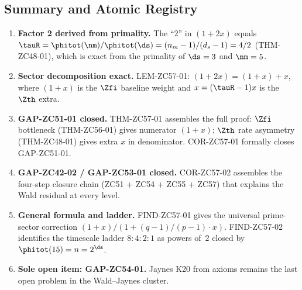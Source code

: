\documentclass[12pt, a4paper]{article}
\begin{document}
\subsection{Summary and Atomic Registry}

\begin{enumerate}[leftmargin=2em]

\item \textbf{Factor 2 derived from primality.}
  The ``$2$'' in $(1+2x)$ equals $\tauR=\phitot(\nm)/\phitot(\ds)
  =(n_m-1)/(d_s-1)=4/2$ (THM-ZC48-01), which is exact from the
  primality of $\ds=3$ and $\nm=5$.

\item \textbf{Sector decomposition exact.}
  LEM-ZC57-01: $(1+2x)=(1+x)+x$, where $(1+x)$ is the $\Zfi$
  baseline weight and $x=(\tauR-1)x$ is the $\Zth$ extra.

\item \textbf{GAP-ZC51-01 closed.}
  THM-ZC57-01 assembles the full proof: $\Zfi$ bottleneck
  (THM-ZC56-01) gives numerator $(1+x)$; $\Zth$ rate asymmetry
  (THM-ZC48-01) gives extra $x$ in denominator.  COR-ZC57-01
  formally closes GAP-ZC51-01.

\item \textbf{GAP-ZC42-02 / GAP-ZC53-01 closed.}
  COR-ZC57-02 assembles the four-step closure chain
  (ZC51 + ZC54 + ZC55 + ZC57) that explains the Wald residual
  at every level.

\item \textbf{General formula and ladder.}
  FIND-ZC57-01 gives the universal prime-sector correction
  $(1+x)/(1+(q-1)/(p-1)\cdot x)$.
  FIND-ZC57-02 identifies the timescale ladder $8:4:2:1$
  as powers of~$2$ closed by $\phitot(15)=n=2^{\ds}$.

\item \textbf{Sole open item: GAP-ZC54-01.}
  Jaynes K20 from axioms remains the last open problem
  in the Wald--Jaynes cluster.

\end{enumerate}
\end{document}
